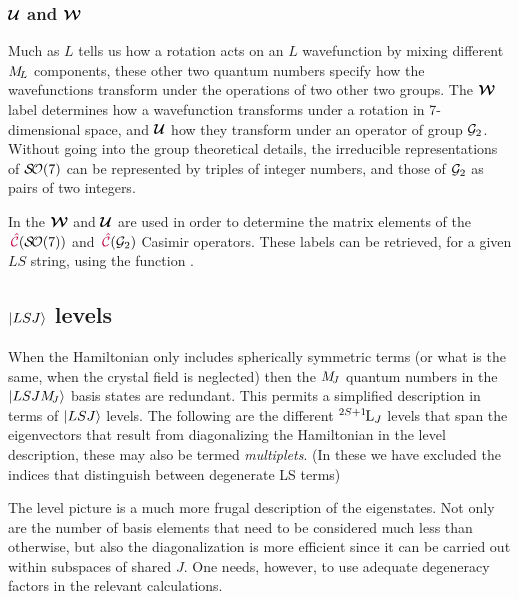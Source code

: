 \documentclass[11pt, twoside,openright]{article}
\begin{document}
 

\subsubsection{$\boldsymbol{\mathcal{U}}$ and $\boldsymbol{\mathcal{W}}$}

Much as $L$ tells us how a rotation acts on an $L$ wavefunction by mixing different $M_{\!{L}}$ components, these other two quantum numbers specify how the wavefunctions transform under the operations of two other two groups. The $\boldsymbol{\mathcal{W}}$ label determines how a wavefunction transforms under a rotation in 7-dimensional space, and $\boldsymbol{\mathcal{U}}$ how they transform under an operator of group $\mathcal{G}_2$. Without going into the group theoretical details, the irreducible representations of $\mathcal{S\!O}(7)$ can be represented by triples of integer numbers, and those of $\mathcal{G}_2$ as pairs of two integers.

In \qlanth the $\boldsymbol{\mathcal{W}}$ and $\boldsymbol{\mathcal{U}}$ are used in order to determine the matrix elements of the ${\,\mathcal{\textcolor{purple}{\hat{C}}}}(\mathcal{S\!O}(7))$ and ${\,\mathcal{\textcolor{purple}{\hat{C}}}}(\mathcal{G}_2)$ Casimir operators. These labels can be retrieved, for a given $LS$ string, using the function .

 


\subsection{$|LSJ\rangle$ levels}

When the Hamiltonian only includes spherically symmetric terms (or what is the same, when the crystal field is neglected) then the $M_{\!{J}}$ quantum numbers in the $|LSJM_{\!{J}}\rangle$ basis states are redundant. This permits a simplified description  in terms of $|LSJ\rangle$ levels. The following are the different ${}^{2S+1}{\kern-0.1em}{\text{L}}_{J}$ levels that span the eigenvectors that result from diagonalizing the Hamiltonian in the level description, these may also be termed \textit{multiplets}. (In these we have excluded the indices that distinguish between degenerate LS terms)



The level picture is a much more frugal description of the eigenstates. Not only are the number of basis elements that need to be considered much less than otherwise, but also the diagonalization is more efficient since it can be carried out within subspaces of shared $J$. One needs, however, to use adequate degeneracy factors in the relevant calculations.
\end{document}
